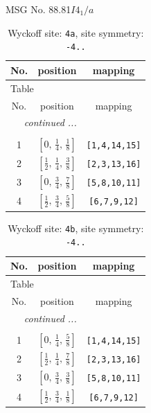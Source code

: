 \documentclass[fleqn,8pt]{jsarticle}
\begin{document}
\setcounter{MaxMatrixCols}{32}

\renewcommand{\tablename}{Table~}
\renewcommand{\figurename}{Figure~}
\begin{center}
\LARGE
MSG No. 88.81\quad$I4_{1}/a$
\end{center}
\renewcommand{\arraystretch}{1.2}
\begin{longtable}{ccc}
\caption{Wyckoff site: {\tt 4a}, site symmetry: {\tt -4..}}
 \\
 \hline \hline
No. & position & mapping \\ \hline \endfirsthead

\multicolumn{2}{l}{\tablename\ \thetable{}} \\
 \hline \hline
No. & position & mapping \\ \hline \endhead

 \hline \hline
\multicolumn{2}{r}{\footnotesize\it continued ...} \\ \endfoot

 \hline \hline
\multicolumn{2}{r}{} \\ \endlastfoot

1 & $\left[ 0,\, \frac{1}{4},\, \frac{1}{8} \right]$ & {\tt [1,4,14,15]} \\ \hline
2 & $\left[ \frac{1}{2},\, \frac{1}{4},\, \frac{3}{8} \right]$ & {\tt [2,3,13,16]} \\ \hline
3 & $\left[ 0,\, \frac{3}{4},\, \frac{7}{8} \right]$ & {\tt [5,8,10,11]} \\ \hline
4 & $\left[ \frac{1}{2},\, \frac{3}{4},\, \frac{5}{8} \right]$ & {\tt [6,7,9,12]} \\
\end{longtable}
\renewcommand{\arraystretch}{1.2}
\begin{longtable}{ccc}
\caption{Wyckoff site: {\tt 4b}, site symmetry: {\tt -4..}}
 \\
 \hline \hline
No. & position & mapping \\ \hline \endfirsthead

\multicolumn{2}{l}{\tablename\ \thetable{}} \\
 \hline \hline
No. & position & mapping \\ \hline \endhead

 \hline \hline
\multicolumn{2}{r}{\footnotesize\it continued ...} \\ \endfoot

 \hline \hline
\multicolumn{2}{r}{} \\ \endlastfoot

1 & $\left[ 0,\, \frac{1}{4},\, \frac{5}{8} \right]$ & {\tt [1,4,14,15]} \\ \hline
2 & $\left[ \frac{1}{2},\, \frac{1}{4},\, \frac{7}{8} \right]$ & {\tt [2,3,13,16]} \\ \hline
3 & $\left[ 0,\, \frac{3}{4},\, \frac{3}{8} \right]$ & {\tt [5,8,10,11]} \\ \hline
4 & $\left[ \frac{1}{2},\, \frac{3}{4},\, \frac{1}{8} \right]$ & {\tt [6,7,9,12]} \\
\end{longtable}
\end{document}

